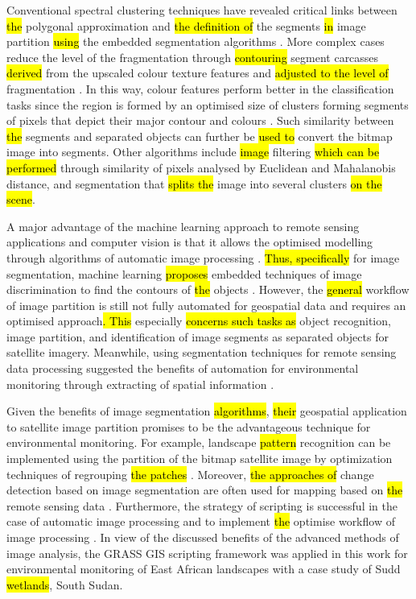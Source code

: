 \documentclass[sustainability,article,submit,pdftex,moreauthors]{Definitions/mdpi}
\begin{document}
Conventional spectral clustering techniques have revealed critical links between \hl{the }polygonal approximation and \hl{the definition of} the segments \hl{in} image partition \hl{using} the embedded segmentation algorithms \cite{Saha,Pugazhenthi,Congetal2018}. More complex cases reduce the level of the fragmentation through\hl{ contouring} segment carcasses \hl{derived }from the upscaled colour texture features and\hl{ adjusted to the level of} fragmentation \cite{1370344}. In this way, colour features perform better in the classification tasks since the region is formed by an optimised size of clusters forming segments of pixels that depict their major contour and colours \cite{1421832}. Such similarity between \hl{the }segments and separated objects can further be \hl{used to }convert\hl{ }the bitmap image into segments. Other algorithms include \hl{image }filtering \hl{which can be performed }through similarity of pixels analysed by Euclidean and Mahalanobis distance, and segmentation that \hl{splits the} image into several clusters \hl{on the scene}\cite{8302195,9302320,5432655}. 

A major advantage of the machine learning approach to remote sensing applications and computer vision is that it allows the optimised modelling through algorithms of automatic image processing \cite{Yamashita,OLIVEIRA2020111830,Bauer,Onishi}. 
\hl{Thus, specifically} for image segmentation,\hl{ }machine learning\hl{ proposes} embedded techniques of image discrimination to find the contours of \hl{the }objects \cite{10073848,8402497,9113204}. However, the \hl{general }workflow of image partition is still not fully automated for geospatial data and requires an optimised approach\hl{. This }especially \hl{concerns such tasks as} object recognition, image partition, and identification of image segments as separated objects for satellite imagery. Meanwhile, using segmentation techniques for remote sensing data processing suggested the benefits of automation for environmental monitoring through extracting of spatial information \cite{Colwell}. 

Given the benefits of image segmentation \hl{algorithms}, \hl{their} geospatial application to satellite image partition promises to be the advantageous technique for environmental monitoring. For example, landscape \hl{pattern} recognition can be implemented using the partition of the bitmap\hl{ }satellite image by optimization techniques of regrouping \hl{the patches }\cite{Lietal2017}. Moreover, \hl{the approaches of }change detection based on image segmentation are often used for mapping based on \hl{the }remote sensing data \cite{LeiNandi}. Furthermore, the strategy of scripting is successful in the case of automatic image processing and to implement \hl{the }optimise workflow of image processing \cite{Borcard,ijgi11090473}. In view of the discussed benefits of the advanced methods of image analysis, the GRASS GIS scripting framework was applied in this work for environmental monitoring of East African landscapes with a case study of Sudd \hl{wetlands}, South Sudan.
\end{document}

